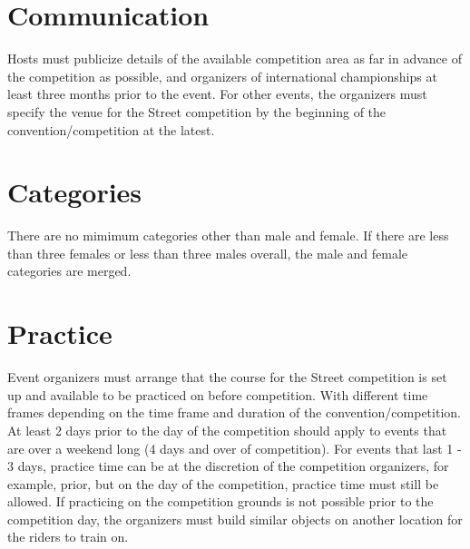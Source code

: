 \section{Communication}

Hosts must publicize details of the available competition area as far in advance of the competition as possible, and organizers of international championships at least three months prior to the event.
For other events, the organizers must specify the venue for the Street competition by the beginning of the convention/competition at the latest.

\section{Categories}
There are no mimimum categories other than male and female.
If there are less than three females or less than three males overall, the male and female categories are merged.

\section{Practice}

Event organizers must arrange that the course for the Street competition is set up and available to be practiced on before competition.
With different time frames depending on the time frame and duration of the convention/competition.
At least 2 days prior to the day of the competition should apply to events that are over a weekend long (4 days and over of competition).
For events that last 1 - 3 days, practice time can be at the discretion of the competition organizers, for example, prior, but on the day of the competition, practice time must still be allowed.
If practicing on the competition grounds is not possible prior to the competition day, the organizers must build similar objects on another location for the riders to train on.
